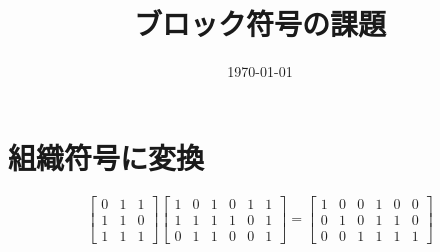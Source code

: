 \documentclass[a4paper,11pt]{jsarticle}
\begin{document}
\title{ブロック符号の課題}
\author{}
\date{\today}
\maketitle

\section{組織符号に変換}
\begin{equation*}
  \begin{bmatrix}
    0 & 1 & 1 \\
    1 & 1 & 0 \\
    1 & 1 & 1
  \end{bmatrix}
  \begin{bmatrix}
    1 & 0 & 1 & 0 & 1 & 1 \\
    1 & 1 & 1 & 1 & 0 & 1 \\
    0 & 1 & 1 & 0 & 0 & 1
  \end{bmatrix}=
  \begin{bmatrix}
    1 & 0 & 0 & 1 & 0 & 0 \\
    0 & 1 & 0 & 1 & 1 & 0 \\
    0 & 0 & 1 & 1 & 1 & 1
  \end{bmatrix}
\end{equation*}
\end{document}
